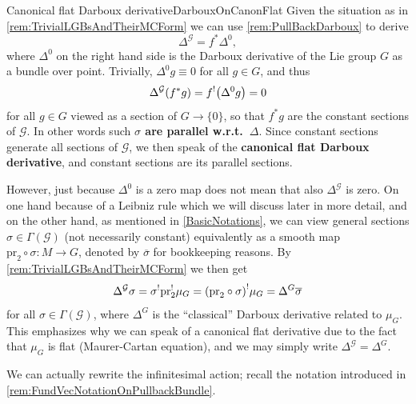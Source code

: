 \documentclass[reqno,a4paper,oneside]{amsart}
\theoremstyle{plain}
\theoremstyle{remark}
\theoremstyle{definition}
\begin{document}
\begin{remarks}{Canonical flat Darboux derivative}{DarbouxOnCanonFlat}
Given the situation as in \ref{rem:TrivialLGBsAndTheirMCForm} we can use \ref{rem:PullBackDarboux} to derive
\begin{equation*}
\Delta^{\mathcal{G}}
=
f^*\Delta^0,
\end{equation*}
where $\Delta^0$ on the right hand side is the Darboux derivative of the Lie group $G$ as a bundle over point. Trivially, $\Delta^0 g \equiv 0$ for all $g \in G$, and thus
\begin{equation*}
\Delta^{\mathcal{G}}(f^*g)
=
f^!\mleft( \Delta^0 g\mright)
=
0
\end{equation*}
for all $g \in G$ viewed as a section of $G \to \{0\}$, so that $f^*g$ are the constant sections of $\mathcal{G}$. In other words such \textbf{$\sigma$ are parallel w.r.t.\ $\Delta$}. Since constant sections generate all sections of $\mathcal{G}$, we then speak of the \textbf{canonical flat Darboux derivative}, and constant sections are its parallel sections.

However, just because $\Delta^0$ is a zero map does not mean that also $\Delta^{\mathcal{G}}$ is zero. On one hand because of a Leibniz rule which we will discuss later in more detail, and on the other hand, as mentioned in \ref{BasicNotations}, we can view general sections $\sigma \in \Gamma(\mathcal{G})$ (not necessarily constant) equivalently as a smooth map $\mathrm{pr}_2 \circ \sigma\colon M \to G$, denoted by $\overline{\sigma}$ for bookkeeping reasons. By \ref{rem:TrivialLGBsAndTheirMCForm} we then get
\begin{equation*}
\Delta^{\mathcal{G}} \sigma
=
\sigma^! \mathrm{pr}_2^!\mu_G
=
\mleft( \mathrm{pr}_2 \circ \sigma \mright)^!\mu_G
=
\Delta^G \overline{\sigma}
\end{equation*}
for all $\sigma \in \Gamma(\mathcal{G})$, where $\Delta^G$ is the ``classical'' Darboux derivative related to $\mu_G$. This emphasizes why we can speak of a canonical flat derivative due to the fact that $\mu_G$ is flat (Maurer-Cartan equation), and we may simply write $\Delta^{\mathcal{G}} = \Delta^G$.
\end{remarks}

We can actually rewrite the infinitesimal action; recall the notation introduced in \ref{rem:FundVecNotationOnPullbackBundle}.
\end{document}
